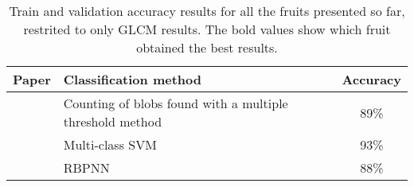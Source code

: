 \documentclass[../main.tex]{subfile}
\begin{document}
\begin{table}[htb]
    \begin{minipage}{\linewidth}
        \caption{Train and validation accuracy results for all the fruits presented so far, restrited to only GLCM results. The bold values show which fruit obtained the best results.}
        \label{tab:related-work}

        \centering
        \begin{tabularx}{.9\linewidth}{ c >{\centering\arraybackslash}X c }
            \toprule
            \textbf{Paper}  & \textbf{Classification method}                           & \textbf{Accuracy} \\
            \midrule
            \cite{II-item1} & Counting of blobs found with a multiple threshold method & 89\%              \\
            \cite{II-item7} & Multi-class SVM                                          & 93\%              \\
            \cite{II-item8} & RBPNN                                                    & 88\%              \\
            \bottomrule
        \end{tabularx}
    \end{minipage}
\end{table}
\end{document}
